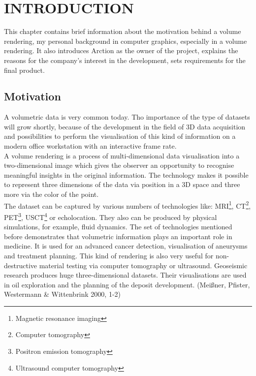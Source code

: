 \documentclass[twoside, english, 11pt]{report}
\begin{document}
\newpage

\tableofcontents

\chapter{INTRODUCTION}
This chapter contains brief information about the motivation behind a volume rendering, my personal background in computer graphics, especially in a volume rendering. It also introduces Arction as the owner of the project, explains the reasons for the company's interest in the development, sets requirements for the final product.
\section{Motivation}

A volumetric data is very common today. Tho importance of the type of datasets will grow shortly, because of the development in the field of 3D data acquisition and possibilities to perform the visualisation of this kind of information on a modern office workstation with an interactive frame rate.\\

A volume rendering is a process of multi-dimensional data visualisation into a two-dimensional image which gives the observer an opportunity to recognise meaningful insights in the original information. The technology makes it possible to represent three dimensions of the data via position in a 3D space and three more via the color of the point.\\

The dataset can be captured by various numbers of technologies like: MRI\footnote{Magnetic resonance imaging}, CT\footnote{Computer tomography}, PET\footnote{Positron emission tomography}, USCT\footnote{Ultrasound computer tomography} or echolocation. They also can be produced by physical simulations, for example, fluid dynamics. The set of technologies mentioned before demonstrates that volumetric information plays an important role in medicine. It is used for an advanced cancer detection, visualisation of aneurysms and treatment planning. This kind of rendering is also very useful for non-destructive material testing via computer tomography or ultrasound. Geoseismic research produces huge three-dimensional datasets. Their visualisations are used in oil exploration and the planning of the deposit development. (Meißner, Pfister, Westermann \& Wittenbrink 2000, 1-2)\\
\end{document}

